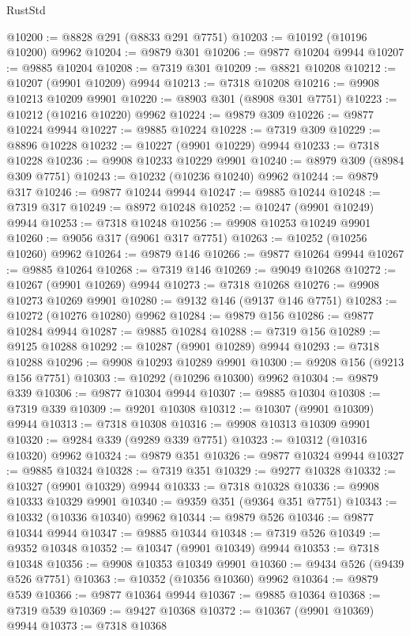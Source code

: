 \begin{lexlean}{RustStd}
\begin{coremodule}
@10200 := @8828 @291 (@8833 @291 @7751)
@10203 := @10192 (@10196 @10200) @9962
@10204 := @9879 @301
@10206 := @9877 @10204 @9944
@10207 := @9885 @10204
@10208 := @7319 @301
@10209 := @8821 @10208
@10212 := @10207 (@9901 @10209) @9944
@10213 := @7318 @10208
@10216 := @9908 @10213 @10209 @9901
@10220 := @8903 @301 (@8908 @301 @7751)
@10223 := @10212 (@10216 @10220) @9962
@10224 := @9879 @309
@10226 := @9877 @10224 @9944
@10227 := @9885 @10224
@10228 := @7319 @309
@10229 := @8896 @10228
@10232 := @10227 (@9901 @10229) @9944
@10233 := @7318 @10228
@10236 := @9908 @10233 @10229 @9901
@10240 := @8979 @309 (@8984 @309 @7751)
@10243 := @10232 (@10236 @10240) @9962
@10244 := @9879 @317
@10246 := @9877 @10244 @9944
@10247 := @9885 @10244
@10248 := @7319 @317
@10249 := @8972 @10248
@10252 := @10247 (@9901 @10249) @9944
@10253 := @7318 @10248
@10256 := @9908 @10253 @10249 @9901
@10260 := @9056 @317 (@9061 @317 @7751)
@10263 := @10252 (@10256 @10260) @9962
@10264 := @9879 @146
@10266 := @9877 @10264 @9944
@10267 := @9885 @10264
@10268 := @7319 @146
@10269 := @9049 @10268
@10272 := @10267 (@9901 @10269) @9944
@10273 := @7318 @10268
@10276 := @9908 @10273 @10269 @9901
@10280 := @9132 @146 (@9137 @146 @7751)
@10283 := @10272 (@10276 @10280) @9962
@10284 := @9879 @156
@10286 := @9877 @10284 @9944
@10287 := @9885 @10284
@10288 := @7319 @156
@10289 := @9125 @10288
@10292 := @10287 (@9901 @10289) @9944
@10293 := @7318 @10288
@10296 := @9908 @10293 @10289 @9901
@10300 := @9208 @156 (@9213 @156 @7751)
@10303 := @10292 (@10296 @10300) @9962
@10304 := @9879 @339
@10306 := @9877 @10304 @9944
@10307 := @9885 @10304
@10308 := @7319 @339
@10309 := @9201 @10308
@10312 := @10307 (@9901 @10309) @9944
@10313 := @7318 @10308
@10316 := @9908 @10313 @10309 @9901
@10320 := @9284 @339 (@9289 @339 @7751)
@10323 := @10312 (@10316 @10320) @9962
@10324 := @9879 @351
@10326 := @9877 @10324 @9944
@10327 := @9885 @10324
@10328 := @7319 @351
@10329 := @9277 @10328
@10332 := @10327 (@9901 @10329) @9944
@10333 := @7318 @10328
@10336 := @9908 @10333 @10329 @9901
@10340 := @9359 @351 (@9364 @351 @7751)
@10343 := @10332 (@10336 @10340) @9962
@10344 := @9879 @526
@10346 := @9877 @10344 @9944
@10347 := @9885 @10344
@10348 := @7319 @526
@10349 := @9352 @10348
@10352 := @10347 (@9901 @10349) @9944
@10353 := @7318 @10348
@10356 := @9908 @10353 @10349 @9901
@10360 := @9434 @526 (@9439 @526 @7751)
@10363 := @10352 (@10356 @10360) @9962
@10364 := @9879 @539
@10366 := @9877 @10364 @9944
@10367 := @9885 @10364
@10368 := @7319 @539
@10369 := @9427 @10368
@10372 := @10367 (@9901 @10369) @9944
@10373 := @7318 @10368

\end{coremodule}
\end{lexlean}
